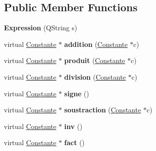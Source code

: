 \subsection*{\-Public \-Member \-Functions}
\begin{DoxyCompactItemize}
\item 
\hypertarget{class_expression_ac25fb301ae3947c964a4da9a95883e72}{{\bfseries \-Expression} (\-Q\-String s)}\label{class_expression_ac25fb301ae3947c964a4da9a95883e72}

\item 
\hypertarget{class_expression_a0fd562e8402f205c6b01018913da01a2}{virtual \hyperlink{class_constante}{\-Constante} $\ast$ {\bfseries addition} (\hyperlink{class_constante}{\-Constante} $\ast$c)}\label{class_expression_a0fd562e8402f205c6b01018913da01a2}

\item 
\hypertarget{class_expression_aaad77013f0b8f7841d0b6edd1a729189}{virtual \hyperlink{class_constante}{\-Constante} $\ast$ {\bfseries produit} (\hyperlink{class_constante}{\-Constante} $\ast$c)}\label{class_expression_aaad77013f0b8f7841d0b6edd1a729189}

\item 
\hypertarget{class_expression_a499a6c6b51a2d08916069177b79c388f}{virtual \hyperlink{class_constante}{\-Constante} $\ast$ {\bfseries division} (\hyperlink{class_constante}{\-Constante} $\ast$c)}\label{class_expression_a499a6c6b51a2d08916069177b79c388f}

\item 
\hypertarget{class_expression_a4859e1a0fcfe29969705e215536c4142}{virtual \hyperlink{class_constante}{\-Constante} $\ast$ {\bfseries signe} ()}\label{class_expression_a4859e1a0fcfe29969705e215536c4142}

\item 
\hypertarget{class_expression_a61f33ec42c2bf4e74a462a55558f7c9a}{virtual \hyperlink{class_constante}{\-Constante} $\ast$ {\bfseries soustraction} (\hyperlink{class_constante}{\-Constante} $\ast$c)}\label{class_expression_a61f33ec42c2bf4e74a462a55558f7c9a}

\item 
\hypertarget{class_expression_a70d49ad794bda7db5a9d2c39a70406bc}{virtual \hyperlink{class_constante}{\-Constante} $\ast$ {\bfseries inv} ()}\label{class_expression_a70d49ad794bda7db5a9d2c39a70406bc}

\item 
\hypertarget{class_expression_a66aaf0f480995508469b7ef6ed2edda6}{virtual \hyperlink{class_constante}{\-Constante} $\ast$ {\bfseries fact} ()}\label{class_expression_a66aaf0f480995508469b7ef6ed2edda6}


\end{DoxyCompactItemize}
